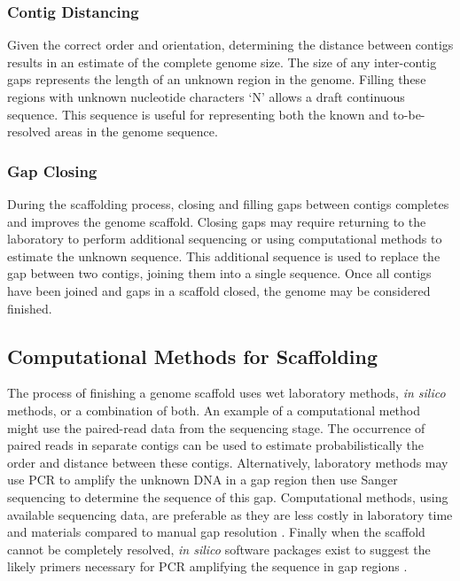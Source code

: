 \documentclass[10pt]{bmc_article}
\newenvironment{bmcformat}{\begin{raggedright}\baselineskip20pt\sloppy\setboolean{publ}{false}}{\end{raggedright}\baselineskip20pt\sloppy}
\begin{document}
\begin{bmcformat}
\subsubsection*{Contig Distancing} %

Given the correct order and orientation, determining the distance between
contigs results in an estimate of the complete genome size. The size of any
inter-contig gaps represents the length of an unknown region in the genome.
Filling these regions with unknown nucleotide characters `N' allows a draft
continuous sequence. This sequence is useful for representing both the known
and to-be-resolved areas in the genome sequence.

\subsubsection*{Gap Closing} %

During the scaffolding process, closing and filling gaps between contigs
completes and improves the genome scaffold. Closing gaps may require returning
to the laboratory to perform additional sequencing or using computational
methods to estimate the unknown sequence. This additional sequence is used to
replace the gap between two contigs, joining them into a single sequence. Once
all contigs have been joined and gaps in a scaffold closed, the genome may be
considered finished.

\subsection*{Computational Methods for Scaffolding} %

The process of finishing a genome scaffold uses wet laboratory methods,
\emph{in silico} methods, or a combination of both. An example of a
computational method might use the paired-read data from the sequencing stage.
The occurrence of paired reads in separate contigs can be used to estimate
probabilistically the order and distance between these contigs. Alternatively,
laboratory methods may use PCR to amplify the unknown DNA in a gap region then
use Sanger sequencing to determine the sequence of this gap. Computational
methods, using available sequencing data, are preferable as they are less
costly in laboratory time and materials compared to manual gap resolution
\cite{nagarajan2010}. Finally when the scaffold cannot be completely resolved,
\emph{in silico} software packages exist to suggest the likely primers
necessary for PCR amplifying the sequence in gap regions \cite{gordon2001}. \pb


\end{bmcformat}
\end{document}
